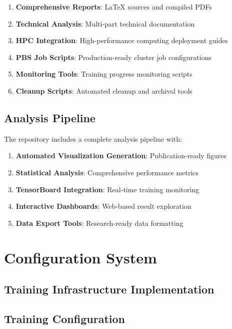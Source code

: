 \documentclass[12pt,a4paper]{article}
\begin{document}
\begin{enumerate}
    \item \textbf{Comprehensive Reports}: LaTeX sources and compiled PDFs
    \item \textbf{Technical Analysis}: Multi-part technical documentation
    \item \textbf{HPC Integration}: High-performance computing deployment guides
    \item \textbf{PBS Job Scripts}: Production-ready cluster job configurations
    \item \textbf{Monitoring Tools}: Training progress monitoring scripts
    \item \textbf{Cleanup Scripts}: Automated cleanup and archival tools
\end{enumerate}

\subsection{Analysis Pipeline}

The repository includes a complete analysis pipeline with:

\begin{enumerate}
    \item \textbf{Automated Visualization Generation}: Publication-ready figures
    \item \textbf{Statistical Analysis}: Comprehensive performance metrics
    \item \textbf{TensorBoard Integration}: Real-time training monitoring
    \item \textbf{Interactive Dashboards}: Web-based result exploration
    \item \textbf{Data Export Tools}: Research-ready data formatting
\end{enumerate}

\section{Configuration System}

\subsection{Training Infrastructure Implementation}

\subsection{Training Configuration}
\end{document}
